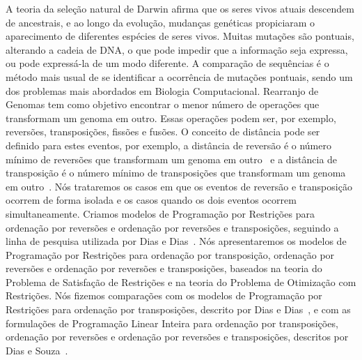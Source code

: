 A teoria da seleção natural de Darwin afirma que os seres vivos atuais
descendem de ancestrais, e ao longo da evolução, mudanças genéticas
propiciaram o aparecimento de diferentes espécies de seres vivos. Muitas
mutações são pontuais, alterando a cadeia de DNA, o que pode impedir que
a informação seja expressa, ou pode expressá-la de um modo diferente. A
comparação de sequências é o método mais usual de se identificar a
ocorrência de mutações pontuais, sendo um dos problemas mais abordados
em Biologia Computacional. Rearranjo de Genomas tem como objetivo
encontrar o menor número de operações que transformam um genoma em
outro. Essas operações podem ser, por exemplo, reversões, transposições,
fissões e fusões. O conceito de distância pode ser definido para estes
eventos, por exemplo, a distância de reversão é o número mínimo de
reversões que transformam um genoma em outro~\cite{BafnaPevzner*1996} e
a distância de transposição é o número mínimo de transposições que
transformam um genoma em outro~\cite{BafnaPevzner*1998}. Nós trataremos
os casos em que os eventos de reversão e transposição ocorrem de forma
isolada e os casos quando os dois eventos ocorrem simultaneamente.
Criamos modelos de Programação por Restrições para ordenação por
reversões e ordenação por reversões e transposições, seguindo a linha de
pesquisa utilizada por Dias e Dias~\cite{DiasDias*2009}. Nós
apresentaremos os modelos de Programação por Restrições para ordenação
por transposição, ordenação por reversões e ordenação por reversões e
transposições, baseados na teoria do Problema de Satisfação de
Restrições e na teoria do Problema de Otimização com Restrições. Nós
fizemos comparações com os modelos de Programação por Restrições para
ordenação por transposições, descrito por Dias e
Dias~\cite{DiasDias*2009}, e com as formulações de Programação Linear
Inteira para ordenação por transposições, ordenação por reversões e
ordenação por reversões e transposições, descritos por Dias e
Souza~\cite{DiasSouza*2007}.

